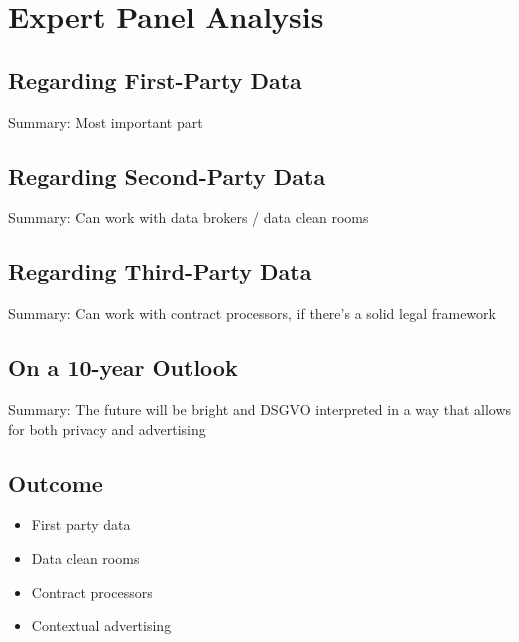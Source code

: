 %
%

\pagebreak
\section{Expert Panel Analysis}

\onehalfspacing

\subsection{Regarding First-Party Data}

Summary: Most important part

\subsection{Regarding Second-Party Data}

Summary: Can work with data brokers / data clean rooms

\subsection{Regarding Third-Party Data}

Summary: Can work with contract processors, if there's a solid legal framework

\subsection{On a 10-year Outlook}

Summary: The future will be bright and DSGVO interpreted in a way that allows for both privacy and advertising

\subsection{Outcome}

\begin{itemize}
 \item First party data 
 \item Data clean rooms
 \item Contract processors
 \item Contextual advertising
\end{itemize}
